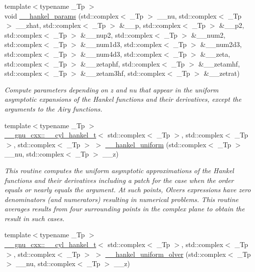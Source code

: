 \begin{DoxyCompactItemize}
\item 
{\footnotesize template$<$typename \+\_\+\+Tp $>$ }\\void \hyperlink{namespacestd_1_1____detail_aff42671a79cd3852a57752f79c82f8da}{\+\_\+\+\_\+hankel\+\_\+params} (std\+::complex$<$ \+\_\+\+Tp $>$ \+\_\+\+\_\+nu, std\+::complex$<$ \+\_\+\+Tp $>$ \+\_\+\+\_\+zhat, std\+::complex$<$ \+\_\+\+Tp $>$ \&\+\_\+\+\_\+p, std\+::complex$<$ \+\_\+\+Tp $>$ \&\+\_\+\+\_\+p2, std\+::complex$<$ \+\_\+\+Tp $>$ \&\+\_\+\+\_\+nup2, std\+::complex$<$ \+\_\+\+Tp $>$ \&\+\_\+\+\_\+num2, std\+::complex$<$ \+\_\+\+Tp $>$ \&\+\_\+\+\_\+num1d3, std\+::complex$<$ \+\_\+\+Tp $>$ \&\+\_\+\+\_\+num2d3, std\+::complex$<$ \+\_\+\+Tp $>$ \&\+\_\+\+\_\+num4d3, std\+::complex$<$ \+\_\+\+Tp $>$ \&\+\_\+\+\_\+zeta, std\+::complex$<$ \+\_\+\+Tp $>$ \&\+\_\+\+\_\+zetaphf, std\+::complex$<$ \+\_\+\+Tp $>$ \&\+\_\+\+\_\+zetamhf, std\+::complex$<$ \+\_\+\+Tp $>$ \&\+\_\+\+\_\+zetam3hf, std\+::complex$<$ \+\_\+\+Tp $>$ \&\+\_\+\+\_\+zetrat)
\begin{DoxyCompactList}\small\item\em Compute parameters depending on z and nu that appear in the uniform asymptotic expansions of the Hankel functions and their derivatives, except the arguments to the Airy functions. \end{DoxyCompactList}\item 
{\footnotesize template$<$typename \+\_\+\+Tp $>$ }\\\hyperlink{struct____gnu__cxx_1_1____cyl__hankel__t}{\+\_\+\+\_\+gnu\+\_\+cxx\+::\+\_\+\+\_\+cyl\+\_\+hankel\+\_\+t}$<$ std\+::complex$<$ \+\_\+\+Tp $>$, std\+::complex$<$ \+\_\+\+Tp $>$, std\+::complex$<$ \+\_\+\+Tp $>$ $>$ \hyperlink{namespacestd_1_1____detail_a4de129af45576a92a42fa2b7fc2d17f3}{\+\_\+\+\_\+hankel\+\_\+uniform} (std\+::complex$<$ \+\_\+\+Tp $>$ \+\_\+\+\_\+nu, std\+::complex$<$ \+\_\+\+Tp $>$ \+\_\+\+\_\+z)
\begin{DoxyCompactList}\small\item\em This routine computes the uniform asymptotic approximations of the Hankel functions and their derivatives including a patch for the case when the order equals or nearly equals the argument. At such points, Olver\textquotesingle{}s expressions have zero denominators (and numerators) resulting in numerical problems. This routine averages results from four surrounding points in the complex plane to obtain the result in such cases. \end{DoxyCompactList}\item 
{\footnotesize template$<$typename \+\_\+\+Tp $>$ }\\\hyperlink{struct____gnu__cxx_1_1____cyl__hankel__t}{\+\_\+\+\_\+gnu\+\_\+cxx\+::\+\_\+\+\_\+cyl\+\_\+hankel\+\_\+t}$<$ std\+::complex$<$ \+\_\+\+Tp $>$, std\+::complex$<$ \+\_\+\+Tp $>$, std\+::complex$<$ \+\_\+\+Tp $>$ $>$ \hyperlink{namespacestd_1_1____detail_abbd697ee381eb2e489caa077ba7b00d9}{\+\_\+\+\_\+hankel\+\_\+uniform\+\_\+olver} (std\+::complex$<$ \+\_\+\+Tp $>$ \+\_\+\+\_\+nu, std\+::complex$<$ \+\_\+\+Tp $>$ \+\_\+\+\_\+z)

\end{DoxyCompactItemize}

